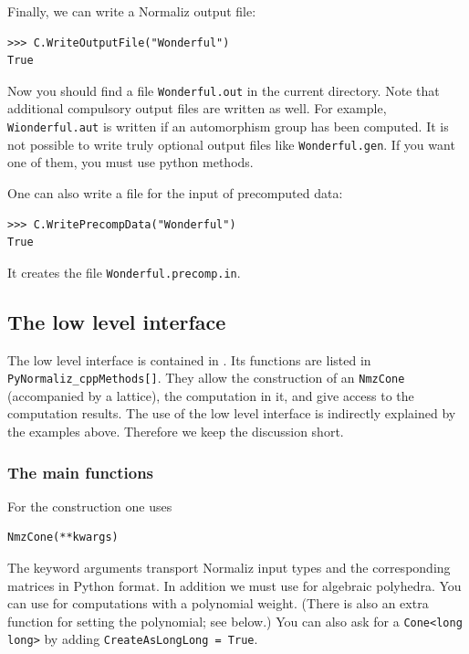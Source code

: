 \begin{small}
Finally, we can write a Normaliz output file:
\begin{Verbatim}
>>> C.WriteOutputFile("Wonderful")
True
\end{Verbatim}
Now you should find a file \verb|Wonderful.out| in the current directory. Note that additional compulsory output files are written as well. For example, \verb*|Wionderful.aut| is written if an automorphism group has been computed. It is not possible to write truly optional output files like \verb*|Wonderful.gen|. If you want one of them, you must use python methods.

One can also write a file for the input of precomputed data:
\begin{Verbatim}
>>> C.WritePrecompData("Wonderful")
True
\end{Verbatim}
It creates the file \verb|Wonderful.precomp.in|.

\subsection{The low level interface}

The low level interface is contained in . Its functions are listed in\\ \verb|PyNormaliz_cppMethods[]|. They allow the construction of an \verb|NmzCone| (accompanied by a lattice), the computation in it, and give access to the computation results. The use of the low level interface is indirectly explained by the examples above. Therefore we keep the discussion short.

\subsubsection{The main functions}

For the construction one uses
\begin{Verbatim}
NmzCone(**kwargs)
\end{Verbatim}
The keyword arguments  transport Normaliz input types and the corresponding matrices in Python format. In addition we must use  for algebraic polyhedra. You can use  for computations with a polynomial weight. (There is also an extra function for setting the polynomial; see below.) You can also ask for a \verb|Cone<long long>| by adding \verb|CreateAsLongLong = True|.


\end{small}
